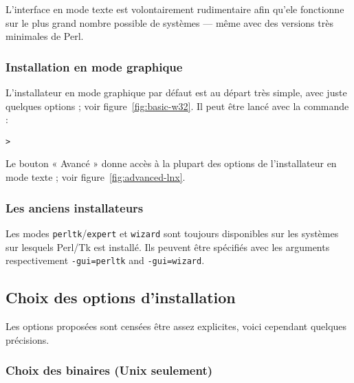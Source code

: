 \documentclass[german, english, french]{article}
\begin{document}
L'interface en mode texte est volontairement rudimentaire afin qu'ele fonctionne
sur le plus grand nombre possible de systèmes --- même avec des versions très
minimales de Perl.

\subsubsection{Installation en mode graphique}
\label{sec:graphical-inst}

L'installateur en mode graphique par défaut est au départ très simple, avec
juste quelques options ; voir figure~\ref{fig:basic-w32}. Il peut être lancé
avec la commande :
\begin{alltt}
> 
\end{alltt}

Le bouton « Avancé » donne accès à la plupart des options de l'installateur en
mode texte ; voir figure~\ref{fig:advanced-lnx}.

\subsubsection{Les anciens installateurs}

Les modes \texttt{perltk}/\texttt{expert} et \texttt{wizard} sont toujours
disponibles sur les systèmes sur lesquels Perl/Tk est installé. Ils peuvent être
spécifiés avec les arguments respectivement \texttt{-gui=perltk} and
\texttt{-gui=wizard}.

\subsection{Choix des options d'installation}
\label{sec:runinstall}

Les options proposées sont censées être assez explicites, voici cependant
quelques précisions.

\subsubsection{Choix des binaires (Unix seulement)}
\label{sec:binary}
\end{document}
